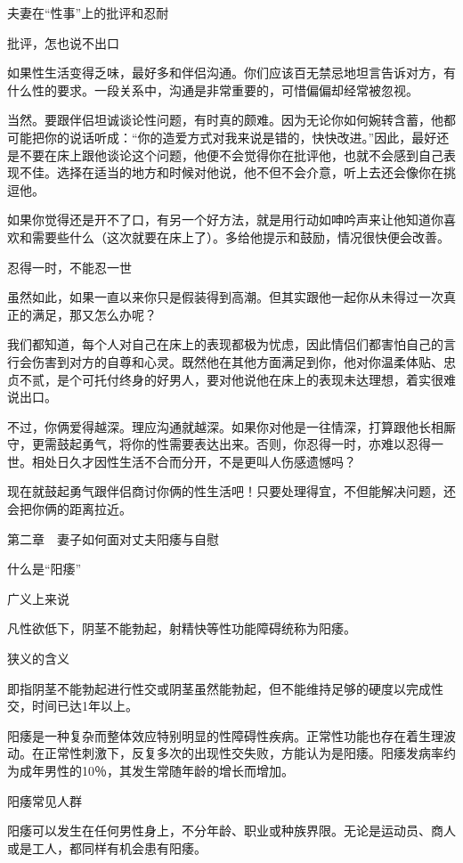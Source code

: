\documentclass[12pt,UTF8]{ctexbook}
\begin{document}
夫妻在“性事”上的批评和忍耐


批评，怎也说不出口

如果性生活变得乏味，最好多和伴侣沟通。你们应该百无禁忌地坦言告诉对方，有什么性的要求。一段关系中，沟通是非常重要的，可惜偏偏却经常被忽视。

当然。要跟伴侣坦诚谈论性问题，有时真的颇难。因为无论你如何婉转含蓄，他都可能把你的说话听成：“你的造爱方式对我来说是错的，快快改进。”因此，最好还是不要在床上跟他谈论这个问题，他便不会觉得你在批评他，也就不会感到自己表现不佳。选择在适当的地方和时候对他说，他不但不会介意，听上去还会像你在挑逗他。

如果你觉得还是开不了口，有另一个好方法，就是用行动如呻吟声来让他知道你喜欢和需要些什么（这次就要在床上了）。多给他提示和鼓励，情况很快便会改善。

忍得一时，不能忍一世

虽然如此，如果一直以来你只是假装得到高潮。但其实跟他一起你从未得过一次真正的满足，那又怎么办呢？

我们都知道，每个人对自己在床上的表现都极为忧虑，因此情侣们都害怕自己的言行会伤害到对方的自尊和心灵。既然他在其他方面满足到你，他对你温柔体贴、忠贞不贰，是个可托付终身的好男人，要对他说他在床上的表现未达理想，着实很难说出口。

不过，你俩爱得越深。理应沟通就越深。如果你对他是一往情深，打算跟他长相厮守，更需鼓起勇气，将你的性需要表达出来。否则，你忍得一时，亦难以忍得一世。相处日久才因性生活不合而分开，不是更叫人伤感遗憾吗？

现在就鼓起勇气跟伴侣商讨你俩的性生活吧！只要处理得宜，不但能解决问题，还会把你俩的距离拉近。





第二章　妻子如何面对丈夫阳痿与自慰


什么是“阳痿”


广义上来说

凡性欲低下，阴茎不能勃起，射精快等性功能障碍统称为阳痿。

狭义的含义

即指阴茎不能勃起进行性交或阴茎虽然能勃起，但不能维持足够的硬度以完成性交，时间已达1年以上。

阳痿是一种复杂而整体效应特别明显的性障碍性疾病。正常性功能也存在着生理波动。在正常性刺激下，反复多次的出现性交失败，方能认为是阳痿。阳痿发病率约为成年男性的10％，其发生常随年龄的增长而增加。





阳痿常见人群


阳痿可以发生在任何男性身上，不分年龄、职业或种族界限。无论是运动员、商人或是工人，都同样有机会患有阳痿。
\end{document}
